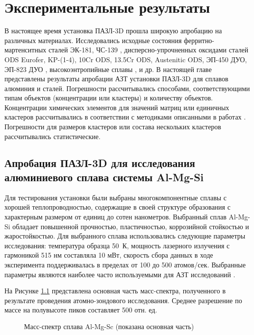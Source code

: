 \chapter{Экспериментальные результаты}\label{ch:ch4}

В настоящее время установка ПАЗЛ-3D прошла широкую апробацию на различных материалах. Исследовались исходные состояния ферритно-мартенситных сталей ЭК-181, ЧС-139 \cite{Rogozhkin19}, дисперсно-упрочненных оксидами сталей ODS Eurofer, KP-(1-4), 10Cr ODS, 13.5Cr ODS, Austenitic ODS, ЭП-450 ДУО, ЭП-823 ДУО \cite{Rogozhkin24,Rogozhkin22},  высокоэнтропийные сплавы \cite{Rogozhkin20}, и др. В настоящей главе представлены результаты апробации АЗТ установки ПАЗЛ-3D для сплавов алюминия и сталей. Погрешности рассчитывались способами, соответствующими типам объектов (концентрации или кластеры) и количеству объектов. Концентрации химических элементов для значений матриц или единичных кластеров рассчитывались в соответствии с методиками описанными в работах \cite{Danoix071,Danoix072}. Погрешности для размеров кластеров или состава нескольких кластеров рассчитывались статистические.


\section{Апробация ПАЗЛ-3D для исследования алюминиевого сплава системы Al-Mg-Si}\label{sec:ch4/sect1}

Для тестирования установки были выбраны многокомпонентные сплавы с хорошей теплопроводностью, содержащие в своей структуре образования с характерным размером от единиц до сотен нанометров. Выбранный сплав Al-Mg-Si обладает повышенной прочностью, пластичностью, коррозийной стойкостью и жаростойкостью. Для выбранного сплава использовались следующие параметры исследования: температура образца 50~К, мощность лазерного излучения с гармоникой 515 нм составляла 10 мВт, скорость сбора данных в ходе эксперимента поддерживалась в пределах от 100 до 500 атомов/сек. Выбранные параметры являются наиболее часто используемыми для АЗТ исследований \cite{GaultBOOK}.

На Рисунке \cref{fig:AlMgSi_mass} представлена основная часть масс-спектра, полученного в результате проведения атомно-зондового исследования. Среднее разрешение по массе на полувысоте пиков составляет 500 отн. ед.

\begin{figure}[htb]
	\caption{Масс-спектр сплава Al-Mg-Sc (показана основная часть)\cite{scbibAlumYAFI}}
	\label{fig:AlMgSi_mass}
\end{figure} 
\FloatBarrier

